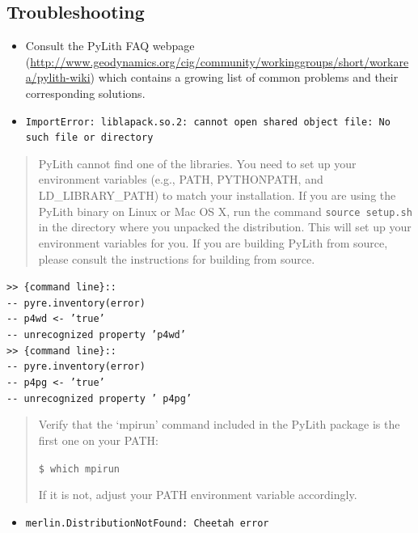 \subsection{Troubleshooting\label{sec:Troubleshooting}}
\begin{itemize}
\item Consult the PyLith FAQ webpage (\url{http://www.geodynamics.org/cig/community/workinggroups/short/workarea/pylith-wiki})
which contains a growing list of common problems and their corresponding
solutions.
\item \texttt{ImportError: liblapack.so.2: cannot open shared object file: No
such file or directory}\end{itemize}
\begin{quote}
PyLith cannot find one of the libraries. You need to set up your environment
variables (e.g., PATH, PYTHONPATH, and LD\_LIBRARY\_PATH) to match
your installation. If you are using the PyLith binary on Linux or
Mac OS X, run the command \texttt{source setup.sh }in the directory
where you unpacked the distribution. This will set up your environment
variables for you. If you are building PyLith from source, please
consult the instructions for building from source.\end{quote}
\begin{itemize}
\begin{singlespace}
\item \texttt{>\textcompwordmark{}> \{command line\}:: }~\\
\texttt{-{}- pyre.inventory(error) }~\\
\texttt{-{}- p4wd <- 'true' }~\\
\texttt{-{}- unrecognized property 'p4wd' }~\\
\texttt{>\textcompwordmark{}> \{command line\}:: }~\\
\texttt{-{}- pyre.inventory(error) }~\\
\texttt{-{}- p4pg <- 'true' }~\\
\texttt{-{}- unrecognized property ' p4pg'}\end{singlespace}
\end{itemize}
\begin{quote}
Verify that the `mpirun' command included in the PyLith package is
the first one on your PATH:

\texttt{\$ which mpirun}

If it is not, adjust your PATH environment variable accordingly.\end{quote}
\begin{itemize}
\item \texttt{\textquotedbl{}merlin.DistributionNotFound: Cheetah\textquotedbl{}
error}\end{itemize}
